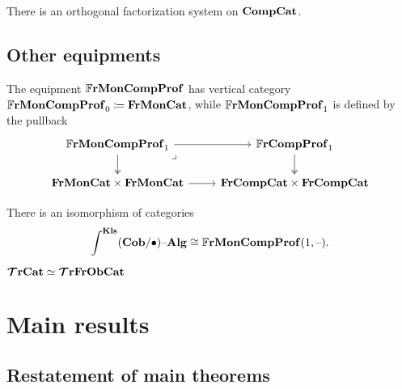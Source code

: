 \documentclass[12pt,oneside,article,draft]{memoir}
\begin{document}
\begin{lemma}\label{lemma:factorization_system}

There is an orthogonal factorization system on $\mathbf{CompCat}$.

\end{lemma}

\section{Other equipments}

\begin{definition}
   The equipment $\mathbb{F}\mathbf{rMonCompProf}$ has vertical category $\mathbb{F}\mathbf{rMonCompProf}_0\coloneqq \mathbf{FrMonCat}$,
   while $\mathbb{F}\mathbf{rMonCompProf}_1$ is defined by the pullback
   \begin{equation*}
      \begin{tikzcd}
         \dFrMonCompProf_1 \ar[r] \ar[d,two heads] \ar[dr,phantom,"\lrcorner" very near start]
            & \dFrCompProf_1 \ar[d,two heads] \\
         \FrMonCat\times\FrMonCat \ar[r]
            & \FrCompCat \times \FrCompCat
      \end{tikzcd}
   \end{equation*}
\end{definition}

\begin{proposition}
   There is an isomorphism of categories
   \begin{equation*}
      \int^{\mathbf{Kls}}(\mathbf{Cob}/\bullet){\text \textendash}\mathbf{Alg}\cong\mathbb{F}\mathbf{rMonCompProf}(1,\textrm{--}).
   \end{equation*}
\end{proposition}

\begin{proposition}\label{prop:TrCat_ObjectFree}

$\bm{\mathcal{T}}\mathbf{rCat}\simeq\bm{\mathcal{T}}\mathbf{rFrObCat}$

\end{proposition}

\chapter{Main results}

\section{Restatement of main theorems}
\end{document}
